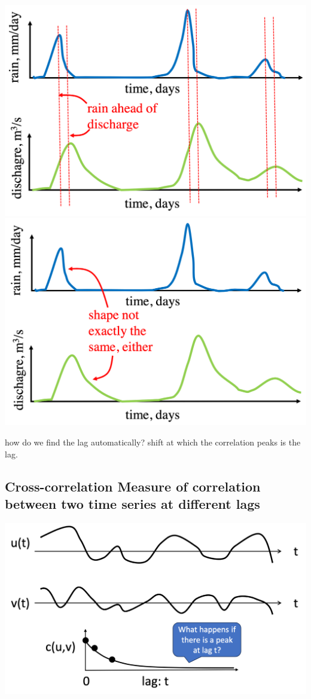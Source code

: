 \documentclass[11pt]{article}
\theoremstyle{definition}
\begin{document}
\includegraphics[width=\textwidth/4]{11.png}
\includegraphics[width=\textwidth/4]{12.png}

how do we find the lag automatically? 
shift at which the correlation peaks is the lag.

\subsection{Cross-correlation
Measure of correlation between two time series
at different lags}
\includegraphics[width=\textwidth/2]{13.png}
\end{document}
